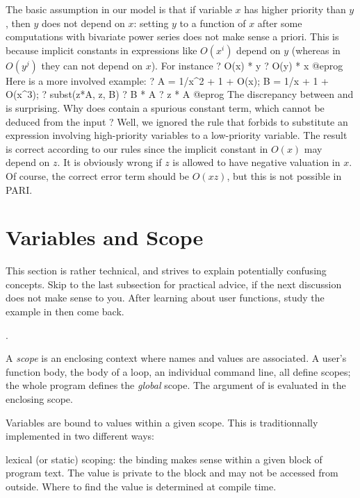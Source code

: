 The basic assumption in our model is that if variable $x$ has higher
priority than $y$, then $y$ does not depend on $x$: setting $y$ to a
function of $x$ after some computations with bivariate power series does
not make sense a priori. This is because implicit constants in
expressions like $O(x^i)$ depend on $y$ (whereas in $O(y^j)$ they can not
depend on $x$). For instance
\bprog
  ? O(x) * y
  ? O(y) * x
@eprog\noindent
Here is a more involved example:
\bprog
  ? A = 1/x^2 + 1 + O(x); B = 1/x + 1 + O(x^3);
  ? subst(z*A, z, B)
  ? B * A
  ? z * A
@eprog\noindent
The discrepancy between  and  is surprising. Why does
 contain a spurious constant term, which cannot be
deduced from the input ? Well, we ignored the rule that forbids to
substitute an expression involving high-priority variables
to a low-priority variable. The result  is correct according to
our rules since the implicit constant in $O(x)$ may depend on $z$. It is
obviously wrong if $z$ is allowed to have negative valuation in $x$. Of
course, the correct error term should be $O(xz)$, but this is not
possible in PARI.

\section{Variables and Scope}\label{se:scope}
This section is rather technical, and strives to explain potentially
confusing concepts. Skip to the last subsection for practical advice, if the
next discussion does not make sense to you. After learning about user
functions, study the example in  then come back.

.

A \emph{scope} is an enclosing context where names and values are associated.
A user's function body, the body of a loop, an individual command line, all
define scopes; the whole program defines the \emph{global} scope. The
argument of  is evaluated in the enclosing scope.

Variables are bound to values within a given scope. This is traditionnally
implemented in two different ways:

\item{} lexical (or static) scoping: the binding makes
sense within a given block of program text. The value is private to the block
and may not be accessed from outside. Where to find the value is determined
at compile time.

